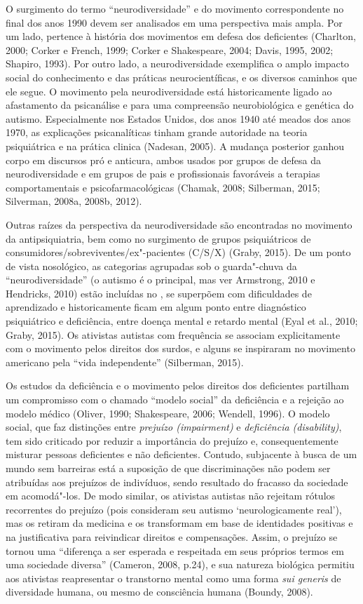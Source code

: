 O surgimento do termo ``neurodiversidade'' e do movimento correspondente
no final dos anos 1990 devem ser analisados em uma perspectiva mais
ampla. Por um lado, pertence à história dos movimentos em defesa dos
deficientes (Charlton, 2000; Corker e French, 1999; Corker e
Shakespeare, 2004; Davis, 1995, 2002; Shapiro, 1993). Por outro lado, a
neurodiversidade exemplifica o amplo impacto social do conhecimento e
das práticas neurocientíficas, e os diversos caminhos que ele segue. O
movimento pela neurodiversidade está historicamente ligado ao
afastamento da psicanálise e para uma compreensão neurobiológica e
genética do autismo. Especialmente nos Estados Unidos, dos anos 1940 até
meados dos anos 1970, as explicações psicanalíticas tinham grande
autoridade na teoria psiquiátrica e na prática clinica (Nadesan, 2005).
A mudança posterior ganhou corpo em discursos pró e anticura, ambos
usados por grupos de defesa da neurodiversidade e em grupos de pais e
profissionais favoráveis a terapias comportamentais e
psicofarmacológicas (Chamak, 2008; Silberman, 2015; Silverman, 2008a,
2008b, 2012).

Outras raízes da perspectiva da neurodiversidade são encontradas no
movimento da antipsiquiatria, bem como no surgimento de grupos
psiquiátricos de consumidores/sobreviventes/ex"-pacientes (C/S/X) (Graby,
2015). De um ponto de vista nosológico, as categorias agrupadas sob o
guarda"-chuva da ``neurodiversidade'' (o autismo é o principal, mas ver
Armstrong, 2010 e Hendricks, 2010) estão incluídas no \emph{}, se
superpõem com dificuldades de aprendizado e historicamente ficam em
algum ponto entre diagnóstico psiquiátrico e deficiência, entre doença
mental e retardo mental (Eyal et al., 2010; Graby, 2015). Os ativistas
autistas com frequência se associam explicitamente com o movimento pelos
direitos dos surdos, e alguns se inspiraram no movimento americano pela
``vida independente'' (Silberman, 2015).

Os estudos da deficiência e o movimento pelos direitos dos deficientes
partilham um compromisso com o chamado ``modelo social'' da deficiência
e a rejeição ao modelo médico (Oliver, 1990; Shakespeare, 2006; Wendell,
1996). O modelo social, que faz distinções entre \emph{prejuízo
(impairment)} e \emph{deficiência (disability)}, tem sido criticado por
reduzir a importância do prejuízo e, consequentemente misturar pessoas
deficientes e não deficientes. Contudo, subjacente à busca de um mundo
sem barreiras está a suposição de que discriminações não podem ser
atribuídas aos prejuízos de indivíduos, sendo resultado do fracasso da
sociedade em acomodá"-los. De modo similar, os ativistas autistas não
rejeitam rótulos recorrentes do prejuízo (pois consideram seu autismo
`neurologicamente real'), mas os retiram da medicina e os transformam em
base de identidades positivas e na justificativa para reivindicar
direitos e compensações. Assim, o prejuízo se tornou uma ``diferença a
ser esperada e respeitada em seus próprios termos em uma sociedade
diversa'' (Cameron, 2008, p.24), e sua natureza biológica permitiu aos
ativistas reapresentar o transtorno mental como uma forma \emph{sui
generis} de diversidade humana, ou mesmo de consciência humana (Boundy,
2008).

